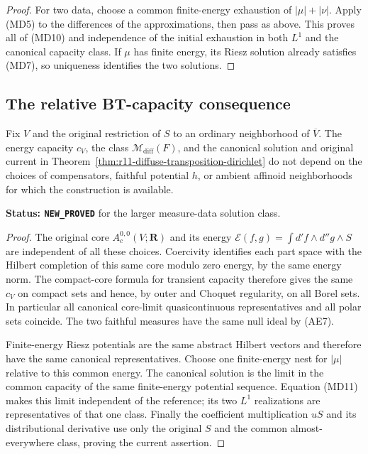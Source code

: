 \begin{proof}
For two data, choose a common finite-energy exhaustion of
$|\mu|+|\nu|$.  Apply (MD5) to the differences of the
approximations, then pass as above.  This proves all of
(MD10) and independence of the initial exhaustion in both
$L^1$ and the canonical capacity class.
If $\mu$ has finite energy, its Riesz solution already
satisfies (MD7), so uniqueness identifies the two solutions.
\end{proof}

\subsection{The relative BT-capacity consequence}

\begin{proposition}
\label{prop:r11-transposition-reference-independence}
Fix $V$ and the original restriction of $S$ to an ordinary
neighborhood of $\overline V$.  The energy capacity $c_V$,
the class $\mathcal M_{\mathrm{diff}}(F)$, and the canonical
solution and original current in
Theorem~\ref{thm:r11-diffuse-transposition-dirichlet} do not depend
on the choices of compensators, faithful potential $h$, or ambient
affinoid neighborhoods for which the construction is available.
\end{proposition}

\noindent\textbf{Status: \texttt{NEW\_PROVED}} for the larger
measure-data solution class.

\begin{proof}
The original core $A_c^{0,0}(V;\mathbf R)$ and its energy
$\mathcal E(f,g)=\int d'f\wedge d''g\wedge S$ are independent
of all these choices.  Coercivity identifies each part space
with the Hilbert completion of this same core modulo zero
energy, by the same energy norm.  The compact-core formula
for transient capacity therefore gives the same $c_V$ on
compact sets and hence, by outer and Choquet regularity, on
all Borel sets.  In particular all canonical core-limit
quasicontinuous representatives and all polar sets coincide.
The two faithful measures have the same null ideal by (AE7).

Finite-energy Riesz potentials are the same abstract Hilbert
vectors and therefore have the same canonical representatives.
Choose one finite-energy nest for $|\mu|$ relative to this
common energy.  The canonical solution is the limit in the
common capacity of the same finite-energy potential sequence.
Equation (MD11) makes this limit independent of the reference;
its two $L^1$ realizations are representatives of that one
class.  Finally the coefficient multiplication $uS$ and its
distributional derivative use only the original $S$ and
the common almost-everywhere class, proving the current assertion.
\end{proof}

